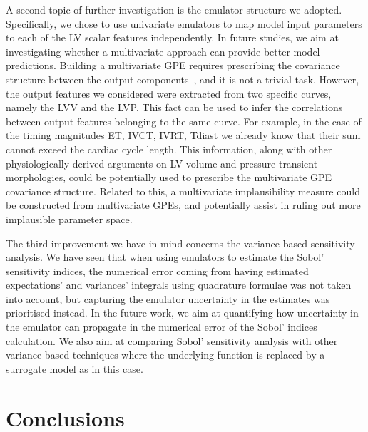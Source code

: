 \vspace{0.2cm}
A second topic of further investigation is the emulator structure we adopted. Specifically, we chose to use univariate emulators to map model input parameters to each of the LV scalar features independently. In future studies, we aim at investigating whether a multivariate approach can provide better model predictions. Building a multivariate GPE requires prescribing the covariance structure between the output components~\cite{Bonilla:2008,Rougier:2008,Conti:2010}, and it is not a trivial task. However, the output features we considered were extracted from two specific curves, namely the LVV and the LVP. This fact can be used to infer the correlations between output features belonging to the same curve. For example, in the case of the timing magnitudes ET, IVCT, IVRT, Tdiast we already know that their sum cannot exceed the cardiac cycle length. This information, along with other physiologically-derived arguments on LV volume and pressure transient morphologies, could be potentially used to prescribe the multivariate GPE covariance structure. Related to this, a multivariate implausibility measure could be constructed from multivariate GPEs, and potentially assist in ruling out more implausible parameter space.

\vspace{0.2cm}
The third improvement we have in mind concerns the variance-based sensitivity analysis. We have seen that when using emulators to estimate the Sobol' sensitivity indices, the numerical error coming from having estimated expectations' and variances' integrals using quadrature formulae was not taken into account, but capturing the emulator uncertainty in the estimates was prioritised instead. In the future work, we aim at quantifying how uncertainty in the emulator can propagate in the numerical error of the Sobol' indices calculation. We also aim at comparing Sobol' sensitivity analysis with other variance-based techniques where the underlying function is replaced by a surrogate model as in this case.


%
%
%
\section{Conclusions}\label{sec:ch9conclusions}
